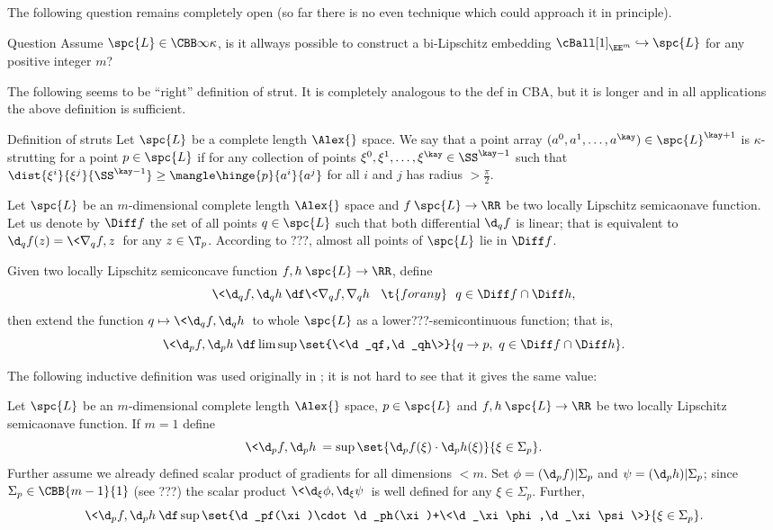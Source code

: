 The following question remains completely open (so far there is no even technique which could approach it in principle).

\begin{thm}{Question}
Assume $\spc{L}\in\CBB\infty\kappa$, 
is it allways possible to construct a bi-Lipschitz embedding $\cBall[1]_{\EE^m}\hookrightarrow \spc{L}$ for any positive integer $m$?
\end{thm}

The following seems to be ``right'' definition of strut.
It is completely analogous to the def in CBA,
but it is  longer and in all applications the above definition is sufficient.%

\begin{thm}{Definition of struts}\label{def:strut-I+}
Let $\spc{L}$ be a complete length $\Alex{}$ space.
We say that a point array $(a^0,a^1,\dots,a^\kay)\in\spc{L}^{\kay+1}$
is $\kappa$-strutting for a point $p\in\spc{L}$ if 
for any collection of points $\xi^0,\xi^1,\dots,\xi^\kay\in \SS^{\kay-1}$
such that $\dist{\xi^i}{\xi^j}{\SS^{\kay-1}}\ge \mangle\hinge{p}{a^i}{a^j}$ for all $i$ and $j$ 
has radius $>\tfrac\pi2$.
\end{thm} 

Let 
$\spc{L}$ be an $m$-dimensional complete length $\Alex{}$ space
and $f\:\spc{L}\to \RR$ be two locally Lipschitz semicaonave function.
Let us denote by $\Diff f$ the set of all points $q\in\spc{L}$ such that
both differential $\d_qf$ is linear;
that is equivalent to $\d_qf(z)=\<\nabla_qf,z\>$ for any $z\in\T_p$.
According to ???, almost all points of $\spc{L}$ lie in $\Diff f$.

Given two locally Lipschitz semiconcave function $f,h\:\spc{L}\to \RR$,
define 
\[
\<\d_qf,\d_qh\>
\df
\<\nabla_qf,\nabla_q h\>
\ \ \t{for any}\ \ 
q\in \Diff f\cap\Diff h,\]
then extend the function $q\mapsto \<\d_qf,\d_qh\>$ to whole $\spc{L}$ as a lower???-semicontinuous function;
that is,
\[
\<\d_pf,\d_ph\>
\df
\limsup\set{\<\d_qf,\d_qh\>}{q\to p,\ q\in \Diff f\cap \Diff h}.
\]

The following inductive definition was used originally in \cite[???]{perelman:DC}; 
it is not hard to see that it gives the same value:

Let $\spc{L}$ be an $m$-dimensional complete length $\Alex{}$ space, 
$p\in\spc{L}$ 
and $f,h\:\spc{L}\to \RR$ be two locally Lipschitz semicaonave function.
If $m=1$ define 
\[
\<\d_p f,\d_ph\>
=
\sup\set{\d_pf(\xi)\cdot\d_ph(\xi)}{\xi\in\Sigma_p}.
\]
Further assume we already defined scalar product of gradients for all dimensions $<m$.
Set $\phi=(\d_pf)|\Sigma_p$ and $\psi=(\d_ph)|\Sigma_p$;
since $\Sigma_p\in\CBB{m-1}{1}$ (see ???) the scalar product
$\<\d_\xi\phi,\d_\xi\psi\>$ is well defined for any $\xi\in\Sigma_p$.
Further, 
\[
\<\d_pf,\d_ph\>
\df
\sup
\set{\d_pf(\xi)\cdot\d_ph(\xi)+\<\d_\xi\phi,\d_\xi\psi\>}%
{\xi\in\Sigma_p}.
\]


